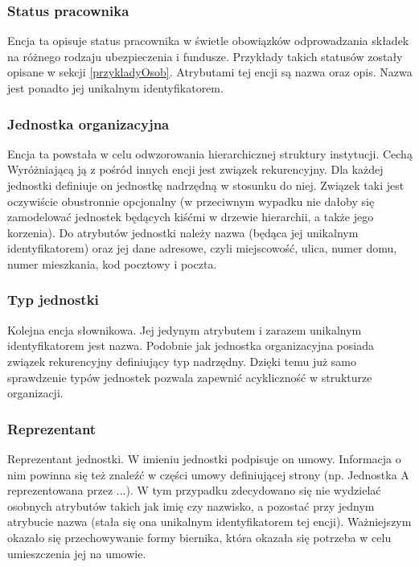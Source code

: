 \subsubsection{Status pracownika}
Encja ta opisuje status pracownika w świetle obowiązków odprowadzania składek na różnego rodzaju ubezpieczenia i fundusze. Przykłady takich statusów zostały opisane w sekcji \ref{przykladyOsob}. Atrybutami tej encji są nazwa oraz opis. Nazwa jest ponadto jej unikalnym identyfikatorem.

\subsubsection{Jednostka organizacyjna}
Encja ta powstała w celu odwzorowania hierarchicznej struktury instytucji. Cechą Wyróżniającą ją z pośród innych encji jest związek rekurencyjny. Dla każdej jednostki definiuje on jednostkę nadrzędną w stosunku do niej. Związek taki jest oczywiście obustronnie opcjonalny (w przeciwnym wypadku nie dałoby się zamodelować jednostek będących kiśćmi w drzewie hierarchii, a także jego korzenia). Do atrybutów jednostki należy nazwa (będąca jej unikalnym identyfikatorem) oraz jej dane adresowe, czyli miejscowość, ulica, numer domu, numer mieszkania, kod pocztowy i poczta.

\subsubsection{Typ jednostki}
Kolejna encja słownikowa. Jej jedynym atrybutem i zarazem unikalnym identyfikatorem jest nazwa. Podobnie jak jednostka organizacyjna posiada związek rekurencyjny definiujący typ nadrzędny. Dzięki temu już samo sprawdzenie typów jednostek pozwala zapewnić acykliczność w strukturze organizacji.

\subsubsection{Reprezentant}
Reprezentant jednostki. W imieniu jednostki podpisuje on umowy. Informacja o nim powinna się też znaleźć w części umowy definiującej strony  (np. Jednostka A reprezentowana przez ...). W tym przypadku zdecydowano się nie wydzielać osobnych atrybutów takich jak imię czy nazwisko, a pozostać przy jednym atrybucie nazwa (stała się ona unikalnym identyfikatorem tej encji). Ważniejszym okazało się przechowywanie formy biernika, która okazała się potrzeba w celu umieszczenia jej na umowie.

